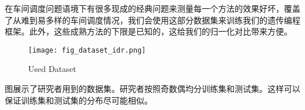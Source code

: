 在车间调度问题语境下有很多现成的经典问题来测量每一个方法的效果好坏，覆盖了从难到易多样的车间调度情况，我们会使用这部分数据集来训练我们的遗传编程框架。此外，这些成熟方法的下限是已知的，这给我们的归一化对比带来方便。

\begin{figure}[H]
    \texttt{[image: fig\_dataset\_idr.png]}
    \caption{Used Dataset}
    \label{fig:dataset_idr}
\end{figure}

图\label{fig:dataset_idr}展示了研究者用到的数据集。研究者按照奇数偶均分训练集和测试集。这样可以保证训练集和测试集的分布尽可能相似。
